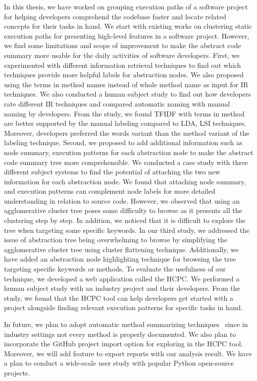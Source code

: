 \label{chapter:conclusion}
In this thesis, we have worked on grouping execution paths of a software project for helping developers comprehend the codebase faster and locate related concepts for their tasks in hand. We start with existing works on clustering static execution paths for presenting high-level features in a software project. However, we find some limitations and scope of improvement to make the abstract code summary more usable for the daily activities of software developers. First, we experimented with different information retrieval techniques to find out which techniques provide more helpful labels for abstraction nodes. We also proposed using the terms in method names instead of whole method name as input for IR techniques. We also conducted a human subject study to find out how developers rate different IR techniques and compared automatic naming with manual naming by developers. From the study, we found TFIDF with terms in method are better supported by the manual labeling compared to LDA, LSI techniques. Moreover, developers preferred the words variant than the method variant of the labeling technique. Second, we proposed to add additional information such as node summary, execution patterns for each abstraction node to make the abstract code summary tree more comprehensible. We conducted a case study with three different subject systems to find the potential of attaching the two new information for each abstraction node. We found that attaching node summary, and execution patterns can complement node labels for more detailed understanding in relation to source code. However, we observed that using an agglomerative cluster tree poses some difficulty to browse as it presents all the clustering step by step. In addition, we noticed that it is difficult to explore the tree when targeting some specific keywords. In our third study, we addressed the issue of abstraction tree being overwhelming to browse by simplifying the agglomerative cluster tree using cluster flattening technique. Additionally, we have added an abstraction node highlighting technique for browsing the tree targeting specific keywords or methods. To evaluate the usefulness of our technique, we developed a web application called the HCPC. We performed a human subject study with an industry project and their developers. From the study, we found that the HCPC tool can help developers get started with a project alongside finding relevant execution patterns for specific tasks in hand.

In future, we plan to adopt automatic method summarizing techniques~\cite{wan2018improvingCodeSummary, ahmad2020transformerCodeSummary, zhu2019automaticSummaryReview} since in industry settings not every method is properly documented. We also plan to incorporate the GitHub project import option for exploring in the HCPC tool. Moreover, we will add feature to export reports with our analysis result. We have a plan to conduct a wide-scale user study with popular Python open-source projects.
